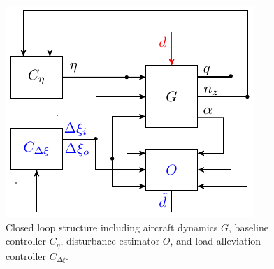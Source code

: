 \documentclass[graybox]{svmult}
\begin{document}
\begin{figure}[h]
	\sidecaption[]
	\includegraphics{closedloop.pdf}
	\caption{Closed loop structure including aircraft dynamics $G$, baseline controller $C_\eta$, disturbance estimator $O$, and  load alleviation controller $C_{\Delta \xi}$. }
	\label{fig:cl}	
\end{figure}
\end{document}
